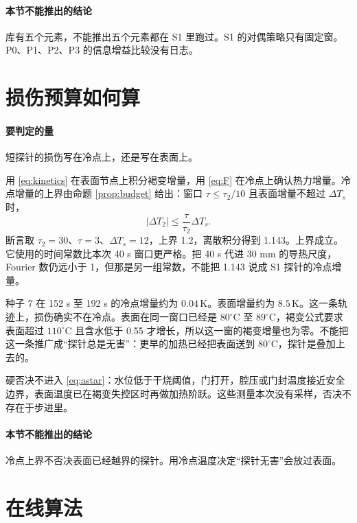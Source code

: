 \paragraph{本节不能推出的结论}
库有五个元素，不能推出五个元素都在 S1 里跑过。S1 的对偶策略只有固定窗。P0、P1、P2、P3 的信息增益比较没有日志。

\section{损伤预算如何算}

\paragraph{要判定的量}
短探针的损伤写在冷点上，还是写在表面上。

用 \eqref{eq:kinetics} 在表面节点上积分褐变增量，用 \eqref{eq:F} 在冷点上确认热力增量。冷点增量的上界由命题 \ref{prop:budget} 给出：窗口 \(\tau\le\tau_2/10\) 且表面增量不超过 \(\Delta T_s\) 时，
\begin{equation}
|\Delta T_2|\le \frac{\tau}{\tau_2}\Delta T_s.
\end{equation}
断言取 \(\tau_2=30\)、\(\tau=3\)、\(\Delta T_s=12\)，上界 1.2，离散积分得到 1.143。上界成立。它使用的时间常数比本次 40 s 窗口更严格。把 40 s 代进 30 mm 的导热尺度，Fourier 数仍远小于 1，但那是另一组常数，不能把 1.143 说成 S1 探针的冷点增量。

种子 7 在 152 s 至 192 s 的冷点增量约为 \(0.04\,\mathrm{K}\)。表面增量约为 \(8.5\,\mathrm{K}\)。这一条轨迹上，损伤确实不在冷点。表面在同一窗口已经是 \(80^\circ\mathrm{C}\) 至 \(89^\circ\mathrm{C}\)，褐变公式要求表面超过 \(110^\circ\mathrm{C}\) 且含水低于 0.55 才增长，所以这一窗的褐变增量也为零。不能把这一条推广成“探针总是无害”：更早的加热已经把表面送到 \(80^\circ\mathrm{C}\)，探针是叠加上去的。

硬否决不进入 \eqref{eq:astar}：水位低于干烧阈值，门打开，腔压或门封温度接近安全边界，表面温度已在褐变失控区时再做加热阶跃。这些测量本次没有采样，否决不存在于步进里。

\paragraph{本节不能推出的结论}
冷点上界不否决表面已经越界的探针。用冷点温度决定“探针无害”会放过表面。

\section{在线算法}

